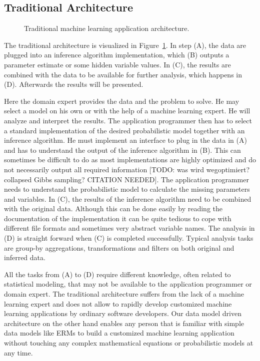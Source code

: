 \subsection{Traditional Architecture}

\begin{figure}[t]
\centering
\scalebox{\tikzScale}{\adjustTikzSize }
\caption{Traditional machine learning application architecture.}\label{fig:ml-application-architecture}
\end{figure}

The traditional architecture is visualized in Figure~\ref{fig:ml-application-architecture}. In step (A), the data are plugged into an inference algorithm implementation, which (B) outputs a parameter estimate or some hidden variable values. In (C), the results are combined with the data to be available for further analysis, which happens in (D). Afterwards the results will be presented.

Here the domain expert provides the data and the problem to solve. He may select a model on his own or with the help of a machine learning expert. He will analyze and interpret the results. The application programmer then has to select a standard implementation of the desired probabilistic model together with an inference algorithm. He must implement an interface to plug in the data in (A) and has to understand the output of the inference algorithm in (B). This can sometimes be difficult to do as most implementations are highly optimized and do not necessarily output all required information [TODO: was wird wegoptimiert? collapsed Gibbs sampling? CITATION NEEDED]. The application programmer needs to understand the probabilistic model to calculate the missing parameters and variables. In (C), the results of the inference algorithm need to be combined with the original data. Although this can be done easily by reading the documentation of the implementation it can be quite tedious to cope with different file formats and sometimes very abstract variable names. The analysis in (D) is straight forward when (C) is completed successfully. Typical analysis tasks are group-by aggregations, transformations and filters on both original and inferred data.

All the tasks from (A) to (D) require different knowledge, often related to statistical modeling, that may not be available to the application programmer or domain expert. The traditional architecture suffers from the lack of a machine learning expert and does not allow to rapidly develop customized machine learning applications by ordinary software developers. Our data model driven architecture on the other hand enables any person that is familiar with simple data models like ERMs to build a customized machine learning application without touching any complex mathematical equations or probabilistic models at any time.

